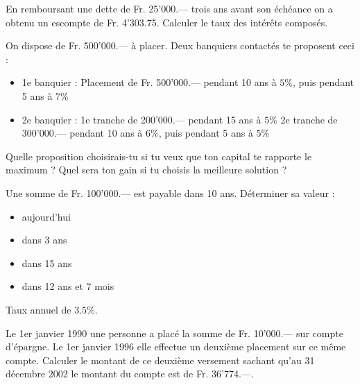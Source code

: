 \begin{exercice}
En remboursant une dette de Fr. 25'000.— trois ans avant son échéance on a obtenu un escompte de Fr. 4'303.75. Calculer le taux des intérêts composés.
\end{exercice}

\begin{exercice}
On dispose de Fr. 500'000.— à placer. Deux banquiers contactés te proposent ceci :
\begin{itemize}
\item 1e banquier : Placement de  Fr. 500'000.–– pendant 10 ans à $5 \%$, puis pendant 5 ans à $7 \%$
\item 2e banquier :  1e  tranche de 200'000.–– pendant 15 ans à $5 \%$
2e  tranche de 300'000.–– pendant 10 ans à $6 \%$, puis pendant 5 ans à $5 \%$
\end{itemize}
Quelle proposition choisirais-tu si tu veux que ton capital te rapporte le maximum ? Quel sera ton gain si tu choisis la meilleure solution ?
\end{exercice}

\begin{exercice}
Une somme de Fr. 100'000.— est payable dans 10 ans. Déterminer sa valeur :
\begin{itemize}
\item aujourd’hui
\item dans 3 ans
\item dans 15 ans
\item dans 12 ans et 7 mois
\end{itemize}
Taux annuel de $3.5 \%$.
\end{exercice}

\begin{exercice}
Le 1er janvier 1990 une personne a placé la somme de Fr. 10'000.— sur compte d'épargne. Le 1er janvier 1996 elle effectue un deuxième placement sur ce même compte. Calculer le montant de ce deuxième versement sachant qu'au 31 décembre 2002 le montant du compte est de Fr. 36'774.—.
\end{exercice}



